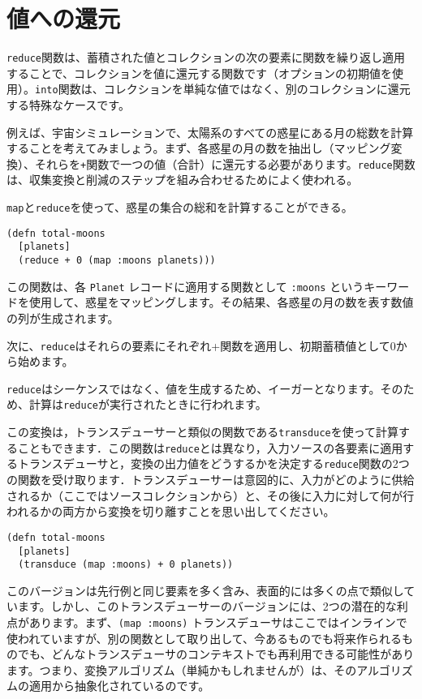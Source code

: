 \section{値への還元}

\texttt{reduce}関数は、蓄積された値とコレクションの次の要素に関数を繰り返し適用することで、コレクションを値に還元する関数です（オプションの初期値を使用）。\texttt{into}関数は、コレクションを単純な値ではなく、別のコレクションに還元する特殊なケースです。

例えば、宇宙シミュレーションで、太陽系のすべての惑星にある月の総数を計算することを考えてみましょう。まず、各惑星の月の数を抽出し（マッピング変換）、それらを\texttt{+}関数で一つの値（合計）に還元する必要があります。\texttt{reduce}関数は、収集変換と削減のステップを組み合わせるためによく使われる。

\texttt{map}と\texttt{reduce}を使って、惑星の集合の総和を計算することができる。



\begin{lstlisting}[numbers=none]
(defn total-moons
  [planets]
  (reduce + 0 (map :moons planets)))
\end{lstlisting}

この関数は、各 \texttt{Planet} レコードに適用する関数として \texttt{:moons} というキーワードを使用して、惑星をマッピングします。その結果、各惑星の月の数を表す数値の列が生成されます。

次に、\texttt{reduce}はそれらの要素にそれぞれ+関数を適用し、初期蓄積値として0から始めます。

\texttt{reduce}はシーケンスではなく、値を生成するため、イーガーとなります。そのため、計算は\texttt{reduce}が実行されたときに行われます。

この変換は，トランスデューサーと類似の関数である\texttt{transduce}を使って計算することもできます．この関数は\texttt{reduce}とは異なり，入力ソースの各要素に適用するトランスデューサと，変換の出力値をどうするかを決定する\texttt{reduce}関数の2つの関数を受け取ります．トランスデューサーは意図的に、入力がどのように供給されるか（ここではソースコレクションから）と、その後に入力に対して何が行われるかの両方から変換を切り離すことを思い出してください。



\begin{lstlisting}[numbers=none]
(defn total-moons
  [planets]
  (transduce (map :moons) + 0 planets))
\end{lstlisting}


このバージョンは先行例と同じ要素を多く含み、表面的には多くの点で類似しています。しかし、このトランスデューサーのバージョンには、2つの潜在的な利点があります。まず、\texttt{(map :moons)} トランスデューサはここではインラインで使われていますが、別の関数として取り出して、今あるものでも将来作られるものでも、どんなトランスデューサのコンテキストでも再利用できる可能性があります。つまり、変換アルゴリズム（単純かもしれませんが）は、そのアルゴリズムの適用から抽象化されているのです。

